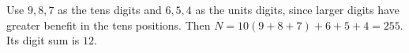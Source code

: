 Use $9,8,7$ as the tens digits and $6,5,4$ as the units digits, since larger digits have greater benefit in the tens positions. Then $N=10(9+8+7)+6+5+4=255$. Its digit sum is $\boxed{12}$.
